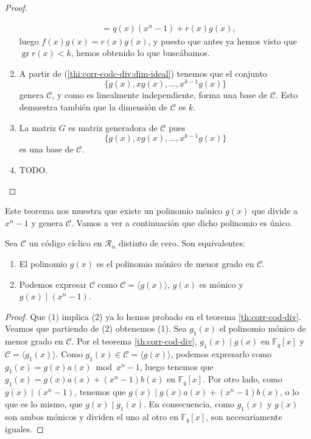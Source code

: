 \begin{proof}
\begin{enumerate}
\begin{align*}
               &= q(x)(x^n - 1) + r(x)g(x),
    \end{align*}
    luego \(f(x)g(x) = r(x)g(x)\), y puesto que antes ya hemos visto que \(\operatorname{gr} r(x) < k\), hemos obtenido lo que buscábamos.
    \item A partir de (\ref{thi:corr-codc-div:dim-ideal}) tenemos que el conjunto \[\{g(x), xg(x), \dots, x^{k-1}g(x)\}\] genera \(\mathcal C\), y como es linealmente independiente, forma una base de \(\mathcal C\).
    Esto demuestra también que la dimensión de \(\mathcal C\) es \(k\).
    \item La matriz \(G\) es matriz generadora de \(\mathcal C\) pues \[\{g(x), xg(x), \dots, x^{k-1}g(x)\}\] es una base de \(\mathcal C\).
    \item TODO. %
  \end{enumerate}
\end{proof}

Este teorema nos muestra que existe un polinomio mónico \(g(x)\) que divide a \(x^n - 1\) y genera \(\mathcal C\).
Vamos a ver a continuación que dicho polinomio es único.

\begin{corollary}
  \label{cor:pol-gen-unico}
  Sea \(\mathcal C\) un código cíclico en \(\mathcal R_n\) distinto de cero.
  Son equivalentes:
  \begin{enumerate}
    \item El polinomio \(g(x)\) es el polinomio mónico de menor grado en \(\mathcal C\).
    \item Podemos expresar \(\mathcal C\) como \(\mathcal C = \langle g(x)\rangle\), \(g(x)\) es mónico y \(g(x) \mid (x^n -1)\).
  \end{enumerate}
\end{corollary}

\begin{proof}
  Que (1) implica (2) ya lo hemos probado en el teorema \ref{th:corr-cod-div}. 
  Veamos que partiendo de (2) obtenemos (1). 
  Sea \(g_1(x)\) el polinomio mónico de menor grado en \(\mathcal C\).
  Por el teorema \ref{th:corr-cod-div}, \(g_1(x) \mid g(x)\) en \(\mathbb F_q[x]\) y \(\mathcal C = \langle g_1(x)\rangle\).
  Como \(g_1(x) \in \mathcal C = \langle g(x) \rangle\), podemos expresarlo como \(g_1(x) = g(x)a(x) \bmod x^n - 1\), luego tenemos que \(g_1(x) = g(x)a(x) + (x^n - 1)b(x)\) en \(\mathbb F_q[x]\).
  Por otro lado, como \(g(x) \mid (x^n - 1)\), tenemos que \(g(x) \mid g(x)a(x) + (x^n-1)b(x)\), o lo que es lo mismo, que \(g(x) \mid g_1(x)\). 
  En consecuencia, como \(g_1(x)\) y \(g(x)\) son ambos mónicos y dividen el uno al otro en \(\mathbb F_q[x]\), son necesariamente iguales.
\end{proof}

